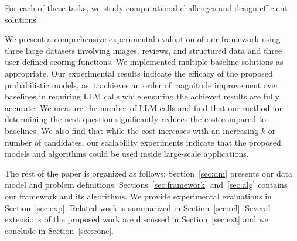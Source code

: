 For each of these tasks, we study computational challenges and design efficient solutions. 

\smallskip {}  We present a comprehensive experimental evaluation of our framework using three large  datasets involving images, reviews, and structured data and three user-defined scoring functions. We implemented multiple baseline solutions as appropriate. Our experimental results indicate the efficacy of the proposed probabilistic models, as it achieves an order of magnitude improvement over baselines in requiring LLM calls while ensuring the achieved results are fully accurate. We measure the number of LLM calls and find that our method for determining the next question significantly reduces the cost compared to baselines. We also find that while the cost increases with an increasing $k$ or number of candidates, our scalability experiments indicate that the proposed models and algorithms could be used inside large-scale applications.

The rest of the paper is organized as follows: Section~\ref{sec:dm} presents our data model and problem definitions. Sections~\ref{sec:framework} and~\ref{sec:alg} contains our framework and its algorithms. We provide experimental evaluations in Section~\ref{sec:exp}. Related work is summarized in Section~\ref{sec:rel}. Several extensions of the proposed work are discussed in Section~\ref{sec:ext} and we conclude in Section~\ref{sec:conc}.